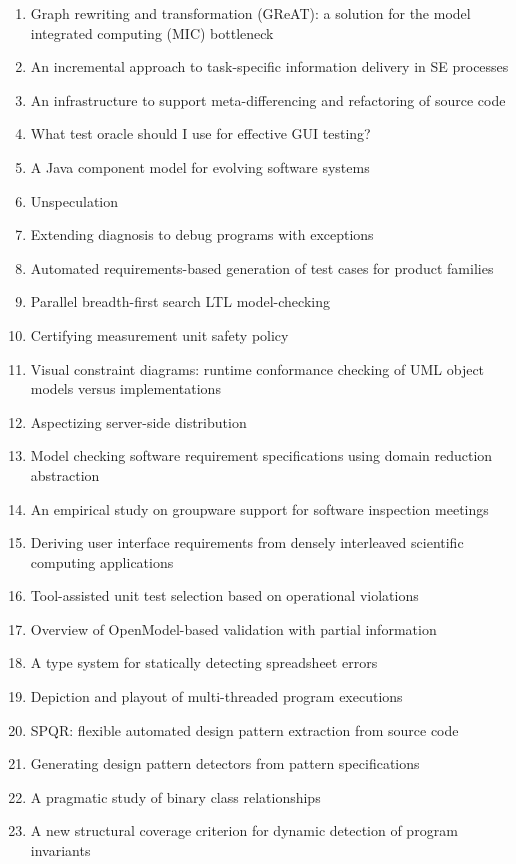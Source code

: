 \begin{enumerate}[itemsep=-1ex]
  \item Graph rewriting and transformation (GReAT): a solution for the model integrated computing (MIC) bottleneck
  \item An incremental approach to task-specific information delivery in SE processes
  \item An infrastructure to support meta-differencing and refactoring of source code
  \item What test oracle should I use for effective GUI testing?
  \item A Java component model for evolving software systems
  \item Unspeculation
  \item Extending diagnosis to debug programs with exceptions
  \item Automated requirements-based generation of test cases for product families
  \item Parallel breadth-first search LTL model-checking
  \item Certifying measurement unit safety policy
  \item Visual constraint diagrams: runtime conformance checking of UML object models versus implementations
  \item Aspectizing server-side distribution
  \item Model checking software requirement specifications using domain reduction abstraction
  \item An empirical study on groupware support for software inspection meetings
  \item Deriving user interface requirements from densely interleaved scientific computing applications
  \item Tool-assisted unit test selection based on operational violations
  \item Overview of OpenModel-based validation with partial information
  \item A type system for statically detecting spreadsheet errors
  \item Depiction and playout of multi-threaded program executions
  \item SPQR: flexible automated design pattern extraction from source code
  \item Generating design pattern detectors from pattern specifications
  \item A pragmatic study of binary class relationships
  \item A new structural coverage criterion for dynamic detection of program invariants

\end{enumerate}
